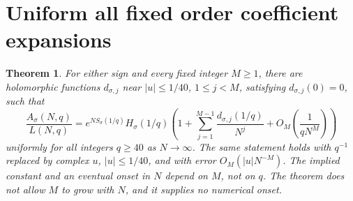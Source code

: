 \documentclass[11pt]{article}
\newtheorem{theorem}{Theorem}[section]
\theoremstyle{definition}
\begin{document}
\section{Uniform all fixed order coefficient expansions}\label{mct:sec:uniform}
\begin{theorem}\label{mct:thm:uniform}
For either sign and every fixed integer $M\ge1$, there are holomorphic functions $d_{\sigma,j}$ near $|u|\le1/40$, $1\le j<M$, satisfying $d_{\sigma,j}(0)=0$, such that
\begin{equation}\label{mct:eq:uniform}
 \frac{A_\sigma(N,q)}{L(N,q)}
 =e^{NS_\sigma(1/q)}H_\sigma(1/q)
 \left(1+\sum_{j=1}^{M-1}\frac{d_{\sigma,j}(1/q)}{N^j}
       +O_M\!\left(\frac{1}{qN^M}\right)\right)
\end{equation}
uniformly for all integers $q\ge40$ as $N\to\infty$.
The same statement holds with $q^{-1}$ replaced by complex $u$, $|u|\le1/40$, and with error $O_M(|u|N^{-M})$. The implied constant and an eventual onset in $N$ depend on $M$, not on $q$. The theorem does not allow $M$ to grow with $N$, and it supplies no numerical onset.
\end{theorem}
\end{document}
